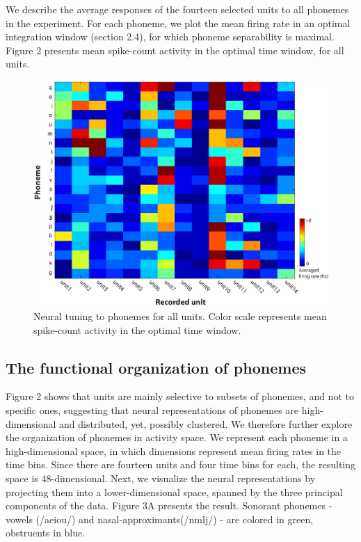 We describe the average responses of the fourteen selected units to all phonemes in the experiment. For each phoneme, we plot the mean firing rate in an optimal integration window (section 2.4), for which phoneme separability is maximal. Figure 2 presents mean spike-count activity in the optimal time window, for all units.

\begin{figure}[H]
\vspace{.3in}
\includegraphics[width=\linewidth]{Figures/Ch3/Figure3_new.eps}
\caption{Neural tuning to phonemes for all units. Color scale represents mean spike-count activity in the optimal time window.}
\end{figure}

\subsection{The functional organization of phonemes}
Figure 2 shows that units are mainly selective to subsets of phonemes, and not to specific ones, suggesting that neural representations of phonemes are high-dimensional and distributed, yet, possibly clustered. We therefore further explore the organization of phonemes in activity space. We represent each phoneme in a high-dimensional space, in which dimensions represent mean firing rates in the time bins. Since there are fourteen units and four time bins for each, the resulting space is 48-dimensional. Next, we visualize the neural representations by projecting them into a lower-dimensional space, spanned by the three principal components of the data. Figure 3A presents the result. Sonorant phonemes - vowels (/aeiou/) and nasal-approximants(/nmlj/) - are colored in green, obstruents in blue.

